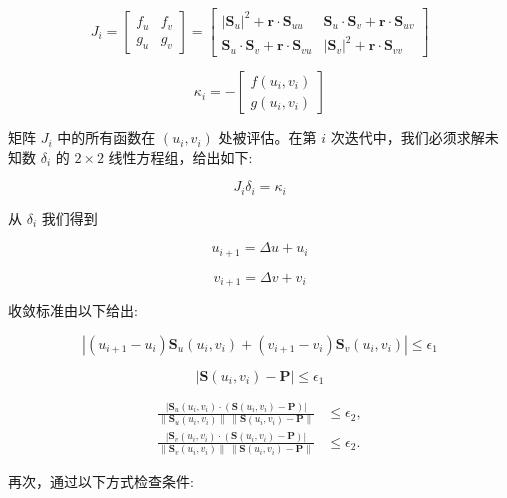 \documentclass[../main.tex]{subfiles}
\begin{document}
\[
{J}_{i} = \left\lbrack  \begin{array}{ll} {f}_{u} & {f}_{v} \\  {g}_{u} & {g}_{v} \end{array}\right\rbrack   = \left\lbrack  \begin{array}{ll} {\left| {\mathbf{S}}_{u}\right| }^{2} + \mathbf{r} \cdot  {\mathbf{S}}_{uu} & {\mathbf{S}}_{u} \cdot  {\mathbf{S}}_{v} + \mathbf{r} \cdot  {\mathbf{S}}_{uv} \\  {\mathbf{S}}_{u} \cdot  {\mathbf{S}}_{v} + \mathbf{r} \cdot  {\mathbf{S}}_{vu} & {\left| {\mathbf{S}}_{v}\right| }^{2} + \mathbf{r} \cdot  {\mathbf{S}}_{vv} \end{array}\right\rbrack
\]

\[
{\kappa }_{i} =  - \left\lbrack  \begin{array}{l} f\left( {{u}_{i},{v}_{i}}\right) \\  g\left( {{u}_{i},{v}_{i}}\right)  \end{array}\right\rbrack
\]

矩阵 \({J}_{i}\) 中的所有函数在 \(\left( {{u}_{i},{v}_{i}}\right)\) 处被评估。在第 \(i\) 次迭代中，我们必须求解未知数 \({\delta }_{i}\) 的 \(2 \times  2\) 线性方程组，给出如下:

\[
{J}_{i}{\delta }_{i} = {\kappa }_{i} \tag{6.6}
\]

从 \({\delta }_{i}\) 我们得到

\[
{u}_{i + 1} = {\Delta u} + {u}_{i}
\]

\[
{v}_{i + 1} = {\Delta v} + {v}_{i} \tag{6.7}
\]

收敛标准由以下给出:

\[
\left| {\left( {{u}_{i + 1} - {u}_{i}}\right) {\mathbf{S}}_{u}\left( {{u}_{i},{v}_{i}}\right)  + \left( {{v}_{i + 1} - {v}_{i}}\right) {\mathbf{S}}_{v}\left( {{u}_{i},{v}_{i}}\right) }\right|  \leq  {\epsilon }_{1}
\]

\[
\left| {\mathbf{S}\left( {{u}_{i},{v}_{i}}\right)  - \mathbf{P}}\right|  \leq  {\epsilon }_{1}
\]

\[
\begin{aligned}
\frac{|\mathbf S_u(u_i,v_i)\cdot(\mathbf S(u_i,v_i)-\mathbf P)|}{\|\mathbf S_u(u_i,v_i)\|\,\|\mathbf S(u_i,v_i)-\mathbf P\|}&\le\epsilon_2,\\
\frac{|\mathbf S_v(u_i,v_i)\cdot(\mathbf S(u_i,v_i)-\mathbf P)|}{\|\mathbf S_v(u_i,v_i)\|\,\|\mathbf S(u_i,v_i)-\mathbf P\|}&\le\epsilon_2.
\end{aligned}\tag{6.8}
\]


再次，通过以下方式检查条件:
\end{document}
